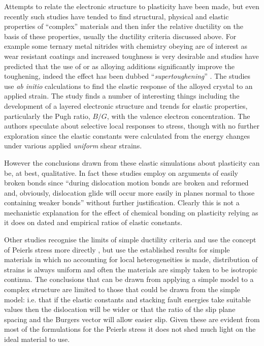 Attempts to relate the electronic structure to plasticity have been made, but even recently such studies have tended to find structural, physical and elastic properties of ``complex'' materials and then infer the relative ductility on the basis of these properties, usually the ductility criteria discussed above. For example some ternary metal nitrides with chemistry obeying  are of interest as wear resistant coatings and increased toughness is very desirable and studies have predicted that the use of  or  as alloying additions significantly improve the toughening, indeed the effect has been dubbed ``\emph{supertoughening}'' \cite{Sangiovanni2010,Sangiovanni2011}. The studies use \emph{ab initio} calculations to find the elastic response of the alloyed crystal to an applied strain. The study finds a number of interesting things including the development of a layered electronic structure and trends for elastic properties, particularly the Pugh ratio, $B/G$, with the valence electron concentration. The authors speculate about selective local responses to stress, though with no further exploration since the elastic constants were calculated from the energy changes under various applied \emph{uniform} shear strains.

However the conclusions drawn from these elastic simulations about plasticity can be, at best, qualitative. In fact these studies employ on arguments of easily broken bonds since ``during dislocation motion bonds are broken and reformed and, obviously, dislocation glide will occur more easily in planes normal to those containing weaker bonds'' \cite{Sangiovanni2011} without further justification. Clearly this is not a mechanistic explanation for the effect of chemical bonding on plasticity relying as it does on dated and empirical ratios of elastic constants.


Other studies recognise the limits of simple ductility criteria and use the concept of Peierls stress more directly \cite{Music2008,Emmerlich2009,Gouriet2015}, but use the established results for simple materials in which no accounting for local heterogeneities is made, distribution of strains is always uniform and often the materials are simply taken to be isotropic continua. The conclusions that can be drawn from applying a simple model to a complex structure are limited to those that could be drawn from the simple model: i.e. that if the elastic constants and stacking fault energies take suitable values then the dislocation will be wider or that the ratio of the slip plane spacing and the Burgers vector will allow easier slip. Given these are evident from most of the formulations for the Peierls stress it does not shed much light on the ideal material to use.



